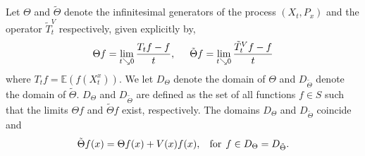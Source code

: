 \documentclass[a4paper,12pt,draft]{report}
\begin{document}
Let $\Theta$ and $\tilde{\Theta}$ denote the infinitesimal generators of the process $(X_t, P_x)$ and the operator $\tilde{T}_t^V$ respectively, given explicitly by,
$$
\Theta f = \lim_{t \searrow 0}\frac{T_tf - f}{t}, \hspace{0.5cm} \tilde{\Theta}f = \lim_{t \searrow 0}\frac{\tilde{T}_t^Vf - f}{t}
$$
where $T_tf = \mathbb{E}(f(X_t^x))$.  We let $D_\Theta$ denote the domain of $\Theta$ and $D_{\tilde{\Theta}}$ denote the domain of $\tilde{\Theta}$.  $D_\Theta$ and $D_{\tilde{\Theta}}$ are defined as the set of all functions $f \in S$ such that the limits $\Theta f$ and $\tilde{\Theta}f$ exist, respectively.
\lemma
{
The domains $D_\Theta$ and $D_{\tilde{\Theta}}$ coincide and
$$
\tilde{\Theta} f(x) = \Theta f(x) + V(x)f(x), \hspace{0.3cm} \text{for} \hspace{0.15cm} f \in D_\Theta = D_{\tilde{\Theta}}.
$$
}
\proof
\end{document}
